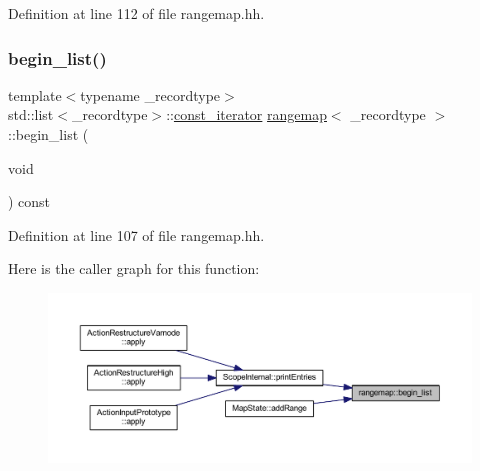 Definition at line 112 of file rangemap.\+hh.

\mbox{\label{classrangemap_a9ec057fb877cddd092b693a6f80f99af}} 
\subsubsection{\texorpdfstring{begin\_list()}{begin\_list()}\hspace{0.1cm}{\footnotesize\ttfamily [1/2]}}
{\footnotesize\ttfamily template$<$typename \+\_\+recordtype$>$ \\
std\+::list$<$\+\_\+recordtype$>$\+::\mbox{\hyperlink{classrangemap_affa7462e68d053d3a066fe0b8d46a99d}{const\+\_\+iterator}} \mbox{\hyperlink{classrangemap}{rangemap}}$<$ \+\_\+recordtype $>$\+::begin\+\_\+list (\begin{DoxyParamCaption}\item[{void}]{ }\end{DoxyParamCaption}) const\hspace{0.3cm}{\ttfamily [inline]}}



Definition at line 107 of file rangemap.\+hh.

Here is the caller graph for this function\+:
\nopagebreak
\begin{figure}[H]
\begin{center}
\leavevmode
\includegraphics[width=350pt]{classrangemap_a9ec057fb877cddd092b693a6f80f99af_icgraph}
\end{center}
\end{figure}
\mbox{\label{classrangemap_acea6b302623df7d3b11df5aca28f72f2}} 

